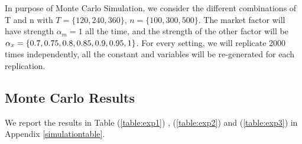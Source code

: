 
In purpose of Monte Carlo Simulation, we consider the different combinations of T and n with $T = \{120, 240, 360\}$, $n =\{100, 300, 500\} $.
The market factor will have strength $\alpha_m = 1$ all the time, and the strength of the other factor will be $\alpha_{x} = \{0.7, 0.75, 0.8,0.85, \\
0.9,0.95, 1\}$. For every setting, we will replicate 2000 times independently, all the constant and variables will be re-generated for each replication.


 
\subsection{Monte Carlo Results}
We report the results in Table (\ref{table:exp1}) , (\ref{table:exp2}) and (\ref{table:exp3}) in Appendix \ref{simulationtable}.

